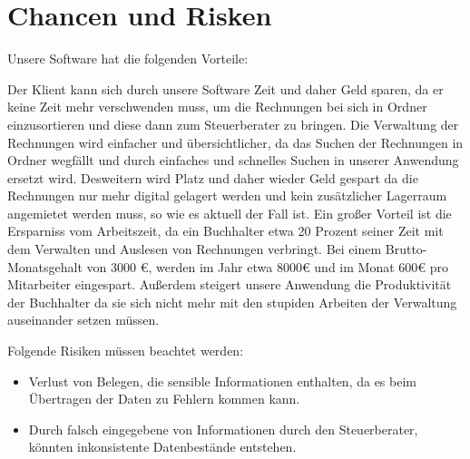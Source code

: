 \documentclass[12pt]{article}
\theoremstyle{definition}
\begin{document}
\pagebreak
\section{Chancen und Risken}


Unsere Software hat die folgenden Vorteile:
\begin{itemize}
Der Klient kann sich durch unsere Software Zeit und daher Geld sparen, da er keine Zeit mehr verschwenden muss, um die Rechnungen bei sich in Ordner einzusortieren und diese dann zum Steuerberater zu bringen.
Die Verwaltung der Rechnungen wird einfacher und übersichtlicher, da das Suchen der Rechnungen in Ordner wegfällt und durch einfaches und schnelles Suchen in unserer Anwendung ersetzt wird.
Desweitern wird Platz und daher wieder Geld gespart da die Rechnungen nur mehr digital gelagert werden und kein zusätzlicher Lagerraum angemietet werden muss, so wie es aktuell der Fall ist.
Ein großer Vorteil ist die Ersparniss vom Arbeitszeit, da ein Buchhalter etwa 20 Prozent seiner Zeit mit dem Verwalten und Auslesen von Rechnungen verbringt. Bei einem Brutto-Monatsgehalt von 3000 €, werden im Jahr etwa 8000€ und im Monat 600€ pro Mitarbeiter eingespart. Außerdem steigert unsere Anwendung die Produktivität der Buchhalter da sie sich nicht mehr mit den stupiden Arbeiten der Verwaltung auseinander setzen müssen.
\end{itemize}

Folgende Risiken müssen beachtet werden:

\begin{itemize}
\item Verlust von Belegen, die sensible Informationen enthalten, da es beim Übertragen der Daten zu Fehlern kommen kann.
\item Durch falsch eingegebene von Informationen durch den Steuerberater, könnten inkonsistente Datenbestände entstehen.
\end{itemize}

\pagebreak
\end{document}
